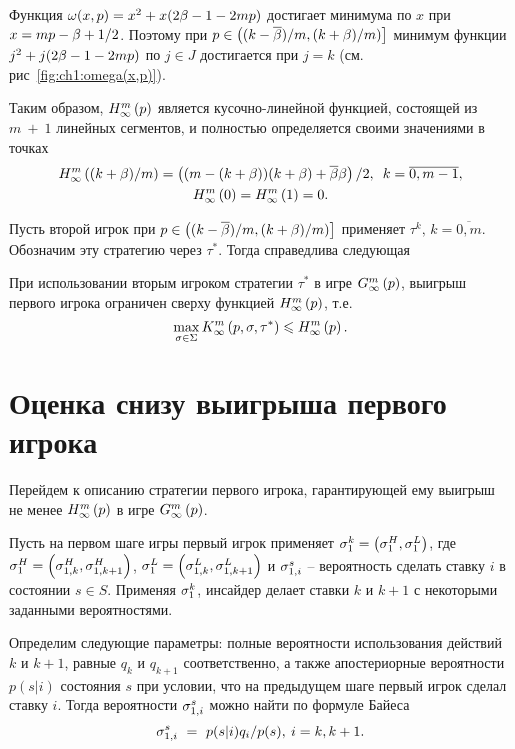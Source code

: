 Функция $\omega(x, p) = x^2 + x(2\Co - 1 - 2mp)$ достигает минимума по $x$ при
$x = m p - \Co + 1/2$. Поэтому при $p \in \left( (k-\DCo)/m, (k+\Co)/m) \right]$
минимум функции $j^2 + j(2\Co - 1 - 2 m p)$ по $j \in J$ достигается при $j = k$
(см. рис~\ref{fig:ch1:omega(x,p)}).

Таким образом, $\upperBound{p}$ является кусочно-линейной функцией, состоящей из
$m~+~1$ линейных сегментов, и полностью определяется своими значениями в точках
\begin{gather*}
  \upperBound{(k+\Co)/m} = \left( (m - (k + \Co))(k + \Co) + \DCo\Co
  \right) / 2, \enskip
  k = \overline{0, m - 1},\\
  \upperBound{0} = \upperBound{1} = 0.
\end{gather*}

Пусть второй игрок при $p \in \left( (k-\DCo)/m, (k+\Co)/m) \right]$
применяет $\tau^k, \, k = \overline{0, m}$. Обозначим эту стратегию через
$\tau^*$. Тогда справедлива следующая
\begin{lemma}
  \label{lemma:upperBound}
  При использовании вторым игроком стратегии $\tau^*$ в игре
  $\infiniteGame{p}$\textup{,} выигрыш первого игрока ограничен сверху функцией
  $\upperBound{p}$, т.е.
  \[
    \max_{\sigma \in \Sigma} \infiniteFirstPlayerPayoff{p}{\sigma}{\tau^*} \leq
    \upperBound{p}.
  \]
\end{lemma}

\section{Оценка снизу выигрыша первого игрока}
Перейдем к описанию стратегии первого игрока, гарантирующей ему выигрыш не менее
$\upperBound{p}$ в игре $\infiniteGame{p}$.

Пусть на первом шаге игры первый игрок применяет %
$\fGeneral{k} = \left(\fGeneral{H}, \fGeneral{L}\right)$, где %
$\fGeneral{H} = \left(\fGeneral[1,k]{H}, \fGeneral[1,k+1]{H}\right)$,
$\fGeneral{L} = \left(\fGeneral[1,k]{L}, \fGeneral[1,k+1]{L}\right)$ и
$\fGeneral[1,i]{s}$ -- вероятность сделать ставку $i$ в состоянии $s \in S$.
Применяя $\fGeneral{k}$, инсайдер делает ставки $k$ и $k+1$ с некоторыми
заданными вероятностями.

Определим следующие параметры: полные вероятности использования действий $k$ и
$k+1$, равные $q_k$ и $q_{k+1}$ соответственно, а также апостериорные
вероятности $p(s|i)$ состояния $s$ при условии, что на предыдущем шаге первый
игрок сделал ставку $i$. Тогда вероятности $\fGeneral[1,i]{s}$ можно найти по
формуле Байеса
\[
  \fGeneral[1,i]{s}~=~p(s|i)q_i/p(s), \: i = k, k + 1.
\]

